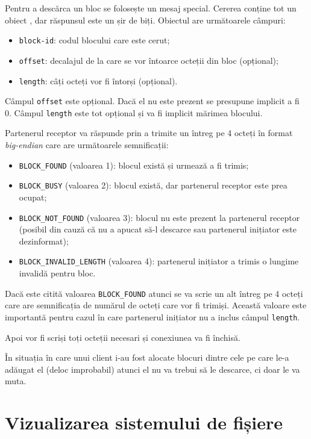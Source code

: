 \documentclass[a4wide,12pt]{report}
\newcommand{\eng}[1]{\emph{#1}} %
\newcommand{\cod}[1]{\texttt{#1}}
\newcommand{\acr}[1]{{\textsmaller[1]{\textsc{#1}}}} %
\begin{document}
Pentru a descărca un bloc se folosește un mesaj special. Cererea conține tot un obiect \acr{JSON}, dar răspunsul este un
șir de biți. Obiectul are următoarele câmpuri:

\begin{itemize}
    \item \cod{block-id}: codul blocului care este cerut;
    \item \cod{offset}: decalajul de la care se vor întoarce octeții din bloc (opțional);
    \item \cod{length}: câți octeți vor fi întorși (opțional).
\end{itemize}

Câmpul \cod{offset} este opțional. Dacă el nu este prezent se presupune implicit a fi 0. Câmpul \cod{length} este tot
opțional și va fi implicit mărimea blocului.

Partenerul receptor va răspunde prin a trimite un întreg pe 4 octeți în format \eng{big-endian} care are următoarele
semnificații:

\begin{itemize}
    \item \cod{BLOCK\_FOUND} (valoarea 1): blocul există și urmează a fi trimis;
    \item \cod{BLOCK\_BUSY} (valoarea 2): blocul există, dar partenerul receptor este prea ocupat;
    \item \cod{BLOCK\_NOT\_FOUND} (valoarea 3): blocul nu este prezent la partenerul receptor (posibil din cauză că nu a
    apucat să-l descarce sau partenerul inițiator este dezinformat);
    \item \cod{BLOCK\_INVALID\_LENGTH} (valoarea 4): partenerul inițiator a trimis o lungime invalidă pentru bloc.
\end{itemize}

Dacă este citită valoarea \cod{BLOCK\_FOUND} atunci se va scrie un alt întreg pe 4 octeți care are semnificația de
numărul de octeți care vor fi trimiși. Această valoare este importantă pentru cazul în care partenerul inițiator nu a
inclus câmpul \cod{length}.

Apoi vor fi scriși toți octeții necesari și conexiunea va fi închisă.

În situația în care unui client i-au fost alocate blocuri dintre cele pe care le-a adăugat el (deloc improbabil) atunci
el nu va trebui să le descarce, ci doar le va muta.

\section{Vizualizarea sistemului de fișiere} %
\end{document}
